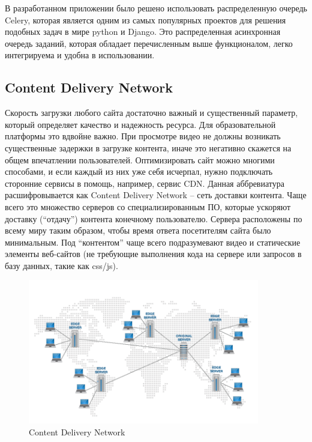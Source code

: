 В разработанном приложении было решено использовать распределенную очередь Celery,
которая является одним из самых популярных проектов для решения подобных задач в мире
python и Django. Это распределенная асинхронная очередь заданий, которая обладает
перечисленным выше функционалом, легко интегрируема и удобна в использовании.

\subsection{Content Delivery Network}

Скорость загрузки любого сайта достаточно важный и существенный параметр, который определяет
качество и надежность ресурса. Для образовательной платформы это вдвойне важно. При просмотре
видео не должны возникать существенные задержки в загрузке контента, иначе это негативно
скажется на общем впечатлении пользователей. Оптимизировать сайт можно многими способами,
и если каждый из них уже себя исчерпал, нужно подключать сторонние сервисы в помощь, например,
сервис CDN. Данная аббревиатура расшифровывается как Content Delivery Network – сеть доставки
контента. Чаще всего это множество серверов со специализированным ПО, которые ускоряют доставку
(“отдачу”) контента конечному пользователю. Сервера расположены по всему миру таким образом,
чтобы время ответа посетителям сайта было минимальным. Под “контентом” чаще всего
подразумевают видео и статические элементы веб-сайтов (не требующие выполнения кода на сервере
или запросов в базу данных, такие как css/js).

\begin{figure}
  \centering
  \includegraphics[width=0.9\textwidth]{images/how-cdn-works.png}
  \caption{Content Delivery Network\label{how-cdn-works}}
\end{figure}

